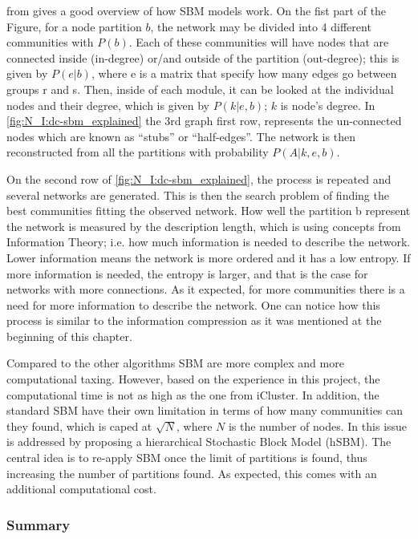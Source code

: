  from \citet{Peixoto2021-jx} gives a good overview of how SBM models work. On the fist part of the Figure, for a node partition $b$, the network may be divided into 4 different communities with $P(b)$. Each of these communities will have nodes that are connected inside (in-degree) or/and outside of the partition (out-degree); this is given by $P(e|b)$, where e is a matrix that specify how many edges go between groups r and s. Then, inside of each module, it can be looked at the individual nodes and their degree, which is given by $ P(k|e,b)$; $k$ is node's degree. In \cref{fig:N_I:dc-sbm_explained} the 3rd graph first row, represents the un-connected nodes which are known as “stubs” or “half-edges”. The network is then reconstructed from all the partitions with probability $P(A|k,e,b)$. 

On the second row of \cref{fig:N_I:dc-sbm_explained}, the process is repeated and several networks are generated. This is then the search problem of finding the best communities fitting the observed network. How well the partition b represent the network is measured by the description length, which is using concepts from Information Theory; i.e. how much information is needed to describe the network. Lower information means the network is more ordered and it has a low entropy. If more information is needed, the entropy is larger, and that is the case for networks with more connections. As it expected, for more communities there is a need for more information to describe the network. One can notice how this process is similar to the information compression as it was mentioned at the beginning of this chapter.

Compared to the other algorithms SBM are more complex and more computational taxing. However, based on the experience in this project, the computational time is not as high as the one from iCluster\citet{Mo2013-zi}. In addition, the standard SBM \citet{Peixoto2019-fg, Peixoto2017-gc, Peixoto2017-ua, Karrer2011-si} have their own limitation in terms of how many communities can they found, which is caped at $\sqrt{N}$, where $N$ is the number of nodes. In \citet{Peixoto2014-yb} this issue is addressed by proposing a hierarchical Stochastic Block Model (hSBM). The central idea is to re-apply SBM once the limit of partitions is found, thus increasing the number of partitions found. As expected, this comes with an additional computational cost.

\subsubsection{Summary}


